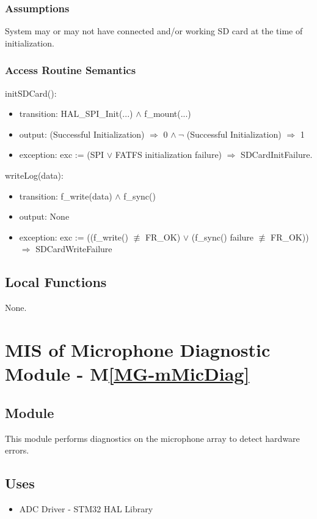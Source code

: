 \documentclass[12pt, titlepage]{article}
\newcommand{\mref}[1]{M\ref{#1}}
\begin{document}
\subsubsection{Assumptions}

System may or may not have connected and/or working SD card at the time of
initialization.

\subsubsection{Access Routine Semantics}
\noindent initSDCard():
\begin{itemize}
\item transition: HAL\_SPI\_Init(...) \(\wedge\) f\_mount(...)
\item output: (Successful Initialization) \(\Rightarrow\) 0 \(\wedge\ \neg\)
  (Successful Initialization) \(\Rightarrow\) 1
\item exception: exc := (SPI \(\vee\) FATFS initialization failure)
\(\Rightarrow\) SDCardInitFailure.
\end{itemize}

\noindent writeLog(data):
\begin{itemize}
  \item transition: f\_write(data) \(\wedge\) f\_sync()
  \item output: None
  \item exception: exc := ((f\_write() \(\not\equiv\) FR\_OK) \(\vee\)
  (f\_sync() failure \(\not\equiv\) FR\_OK)) \(\Rightarrow\) SDCardWriteFailure 
\end{itemize}

\subsection{Local Functions}
None.

\newpage

\section{MIS of Microphone Diagnostic Module \label{mod:MicDiag}-
\mref{MG-mMicDiag}}
\subsection{Module}
This module performs diagnostics on the microphone array to detect hardware
errors.

\subsection{Uses}
\begin{itemize}
  \item ADC Driver - STM32 HAL Library \cite{STM_USER_MANUAL}
\end{itemize}
\end{document}
